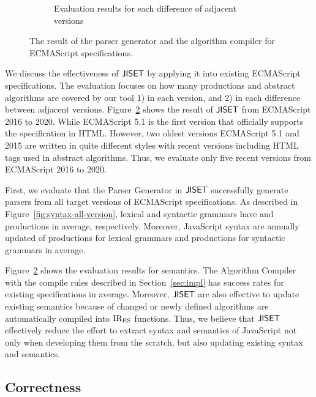\begin{figure}[t]
\begin{subfigure}{0.20\textwidth}
    \caption{Evaluation results for each difference of adjacent versions}
    \label{fig:semantics-all-version-delta}
  \end{subfigure}
  \caption{The result of the parser generator and the algorithm compiler for
  ECMAScript specifications.}
  \label{fig:all-version}
\end{figure}

We discuss the effectiveness of \( \text{\sf JISET} \) by applying it into existing ECMAScript specifications.
The evaluation focuses on how many productions and abstract algorithms are covered by
our tool 1) in each version, and 2) in each difference between adjacent versions.
Figure~\ref{fig:all-version} shows the result of \( \text{\sf JISET} \) from ECMAScript 2016
to 2020. While ECMAScript 5.1 is the first version that officially supports
the specification in HTML. However, two oldest versions ECMAScript 5.1 and 2015 are written
in quite different styles with recent versions including HTML tags used in abstract algorithms.
Thus, we evaluate only five recent versions from ECMAScript 2016 to 2020.

First, we evaluate that the \textsf{Parser Generator} in \( \text{\sf JISET} \) successfully generate
parsers from all target versions of ECMAScript specifications. As described in
Figure~\ref{fig:syntax-all-version}, lexical and syntactic grammars
have  and  productions in average, respectively.
Moreover, JavaScript syntax are annually updated of  productions for lexical grammars
and  productions for syntactic grammars in average.

Figure~\ref{fig:all-version} shows the evaluation results for semantics.
The \textsf{Algorithm Compiler} with the compile rules described in Section~\ref{sec:impl}
has  success rates for existing specifications in average. Moreover,
\( \text{\sf JISET} \) are also effective to update existing semantics
because  of changed or newly defined algorithms are automatically
compiled into \( \text{IR}_\text{ES} \) functions. Thus, we believe that \( \text{\sf JISET} \) effectively
reduce the effort to extract syntax and semantics of JavaScript
not only when developing them from the scratch, but also updating existing syntax and semantics.

\subsection{Correctness}

